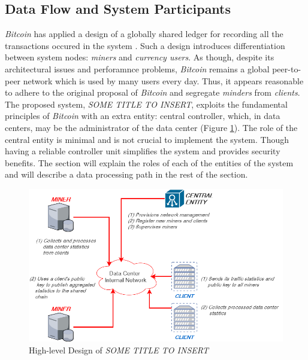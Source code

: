 \documentclass{article}
\newcommand{\projTitle}{SOME TITLE TO INSERT}
\begin{document}
\subsection{Data Flow and System Participants}
 \textit{Bitcoin} has applied a design of a globally shared ledger for recording all the transactions occured in the system \cite{bitcoin_paper}. Such a design introduces differentiation between system nodes: \textit{miners} and \textit{currency users}. As though, despite its architectural issues and perforamnce problems, \textit{Bitcoin} remains a global peer-to-peer network which is used by many users every day. Thus, it appears reasonable to adhere to the original proposal of \textit{Bitcoin} and segregate \textit{minders} from \textit{clients}. The proposed system, \textit{\projTitle}, exploits the fundamental principles of \textit{Bitcoin} with an extra entity: central controller, which, in data centers, may be the administrator of the data center (Figure \ref{fig:project_design}). The role of the central entity is minimal and is not crucial to implement the system. Though having a reliable controller unit simplifies the system and provides security benefits. The section will explain the roles of each of the entities of the system and will describe a data processing path in the rest of the section.
   
\begin{figure}[h!]
  \includegraphics[width=0.6\linewidth]{project_design.png}
  \caption{High-level Design of \textit{\projTitle}}
  \label{fig:project_design}
\end{figure}
\end{document}
